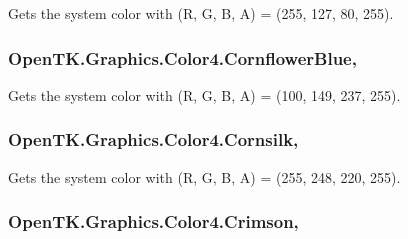 Gets the system color with (R, G, B, A) = (255, 127, 80, 255). 

\hypertarget{struct_open_t_k_1_1_graphics_1_1_color4_ab288312edaec7b58164aa0a4631aa777}{
\subsubsection[{Cornflower\-Blue}]{ Open\-T\-K.\-Graphics.\-Color4.\-Cornflower\-Blue\hspace{0.3cm}{\ttfamily [static]}, {\ttfamily [get]}}}\label{struct_open_t_k_1_1_graphics_1_1_color4_ab288312edaec7b58164aa0a4631aa777}


Gets the system color with (R, G, B, A) = (100, 149, 237, 255). 

\hypertarget{struct_open_t_k_1_1_graphics_1_1_color4_a09fdbf67e7e0b5566a49fc6e82082d16}{
\subsubsection[{Cornsilk}]{ Open\-T\-K.\-Graphics.\-Color4.\-Cornsilk\hspace{0.3cm}{\ttfamily [static]}, {\ttfamily [get]}}}\label{struct_open_t_k_1_1_graphics_1_1_color4_a09fdbf67e7e0b5566a49fc6e82082d16}


Gets the system color with (R, G, B, A) = (255, 248, 220, 255). 

\hypertarget{struct_open_t_k_1_1_graphics_1_1_color4_acd4f65cfa6603eebfebf2cf170766608}{
\subsubsection[{Crimson}]{ Open\-T\-K.\-Graphics.\-Color4.\-Crimson\hspace{0.3cm}{\ttfamily [static]}, {\ttfamily [get]}}}\label{struct_open_t_k_1_1_graphics_1_1_color4_acd4f65cfa6603eebfebf2cf170766608}


